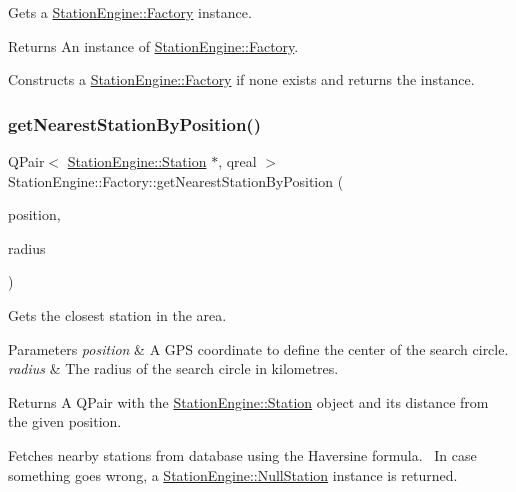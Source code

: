 Gets a \mbox{\hyperlink{classQRail_1_1StationEngine_1_1Factory}{Station\+Engine\+::\+Factory}} instance. 

\begin{DoxyReturn}{Returns}
An instance of \mbox{\hyperlink{classQRail_1_1StationEngine_1_1Factory}{Station\+Engine\+::\+Factory}}.
\end{DoxyReturn}
Constructs a \mbox{\hyperlink{classQRail_1_1StationEngine_1_1Factory}{Station\+Engine\+::\+Factory}} if none exists and returns the instance. \mbox{\label{classQRail_1_1StationEngine_1_1Factory_a385cbfbc2697c39bd2c09b866bdfd4ac}} 
\subsubsection{\texorpdfstring{getNearestStationByPosition()}{getNearestStationByPosition()}}
{\footnotesize\ttfamily Q\+Pair$<$ \mbox{\hyperlink{classQRail_1_1StationEngine_1_1Station}{Station\+Engine\+::\+Station}} $\ast$, qreal $>$ Station\+Engine\+::\+Factory\+::get\+Nearest\+Station\+By\+Position (\begin{DoxyParamCaption}\item[{const Q\+Geo\+Coordinate \&}]{position,  }\item[{const qreal}]{radius }\end{DoxyParamCaption})}



Gets the closest station in the area. 


\begin{DoxyParams}{Parameters}
{\em position} & A G\+PS coordinate to define the center of the search circle. \\
\hline
{\em radius} & The radius of the search circle in kilometres. \\
\hline
\end{DoxyParams}
\begin{DoxyReturn}{Returns}
A Q\+Pair with the \mbox{\hyperlink{classQRail_1_1StationEngine_1_1Station}{Station\+Engine\+::\+Station}} object and it\textquotesingle{}s distance from the given position.
\end{DoxyReturn}
Fetches nearby stations from database using the Haversine formula.~\newline
 In case something goes wrong, a \mbox{\hyperlink{classQRail_1_1StationEngine_1_1NullStation}{Station\+Engine\+::\+Null\+Station}} instance is returned. \mbox{\label{classQRail_1_1StationEngine_1_1Factory_ad7b0c3ee3716d2a99643c0c7b0b9a9c0}} 
